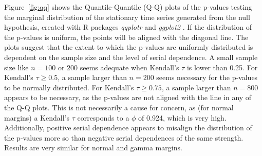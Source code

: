 \documentclass[APA,Times1COL]{WileyNJDv5} %
\begin{document}
Figure~\ref{fig:qq} shows the Quantile-Quantile (Q-Q)
plots of the p-values testing the marginal distribution of the stationary time
series generated from the null hypothesis, created with R packages
\textsl{qqplotr} and \textsl{ggplot2} \citep{qqplotr, ggplot2}. If the
distribution of the p-values is uniform, the points will be aligned with the
diagonal line. The plots suggest that the extent to which the p-values are
uniformly distributed is dependent on the sample size and the level of serial 
dependence.
A small sample size like $n = 100$ or $200$ seems adequate when Kendall's
$\tau$ is lower than 0.25. For Kendall's $\tau \geq 0.5$, a sample larger than
$n = 200$ seems necessary for the p-values to be normally distributed. For
Kendall's $\tau \geq 0.75$, a sample larger than $n = 800$ appears to be 
necessary, as the p-values are not aligned with the line in any of the Q-Q 
plots. This
is not necessarily a cause for concern, as (for normal margins)
a Kendall's $\tau$ corresponds to
a $\phi$ of 0.924, which is very high.
Additionally, positive serial dependence appears to misalign the distribution
of the p-values more so than negative serial dependences of the same strength.
Results are very similar for normal and gamma margins.
\end{document}
